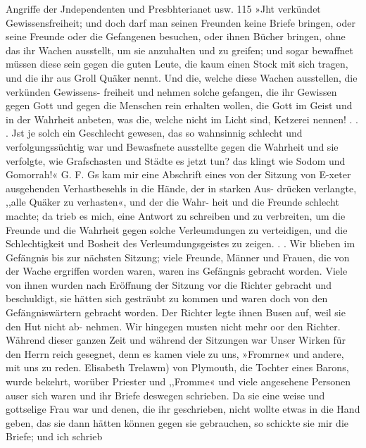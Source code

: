 Angriffe der Jndependenten und Presbhterianet usw. 115
»Jht verkündet Gewissensfreiheit; und doch darf man seinen
Freunden keine Briefe bringen, oder seine Freunde oder die
Gefangenen besuchen, oder ihnen Bücher bringen, ohne das ihr
Wachen ausstellt, um sie anzuhalten und zu greifen; und sogar
bewaffnet müssen diese sein gegen die guten Leute, die kaum
einen Stock mit sich tragen, und die ihr aus Groll Quäker nennt.
Und die, welche diese Wachen ausstellen, die verkünden Gewissens-
freiheit und nehmen solche gefangen, die ihr Gewissen gegen Gott
und gegen die Menschen rein erhalten wollen, die Gott im Geist
und in der Wahrheit anbeten, was die, welche nicht im Licht sind,
Ketzerei nennen! . . . Jst je solch ein Geschlecht gewesen, das
so wahnsinnig schlecht und verfolgungssüchtig war und Bewasfnete
ausstellte gegen die Wahrheit und sie verfolgte, wie Grafschasten
und Städte es jetzt tun? das klingt wie Sodom und Gomorrah!«
G. F.
Gs kam mir eine Abschrift eines von der Sitzung von E-xeter
ausgehenden Verhastbesehls in die Hände, der in starken Aus-
drücken verlangte, ,,alle Quäker zu verhasten«, und der die Wahr-
heit und die Freunde schlecht machte; da trieb es mich, eine
Antwort zu schreiben und zu verbreiten, um die Freunde und
die Wahrheit gegen solche Verleumdungen zu verteidigen, und
die Schlechtigkeit und Bosheit des Verleumdungsgeistes zu zeigen. . .
Wir blieben im Gefängnis bis zur nächsten Sitzung; viele
Freunde, Männer und Frauen, die von der Wache ergriffen
worden waren, waren ins Gefängnis gebracht worden. Viele
von ihnen wurden nach Eröffnung der Sitzung vor die Richter
gebracht und beschuldigt, sie hätten sich gesträubt zu kommen
und waren doch von den Gefängniswärtern gebracht worden.
Der Richter legte ihnen Busen auf, weil sie den Hut nicht ab-
nehmen. Wir hingegen musten nicht mehr oor den Richter.
Während dieser ganzen Zeit und während der Sitzungen war
Unser Wirken für den Herrn reich gesegnet, denn es kamen viele
zu uns, »Fromrne« und andere, mit uns zu reden. Elisabeth
Trelawm) von Plymouth, die Tochter eines Barons, wurde bekehrt,
worüber Priester und ,,Fromme« und viele angesehene Personen
auser sich waren und ihr Briefe deswegen schrieben. Da sie eine
weise und gottselige Frau war und denen, die ihr geschrieben,
nicht wollte etwas in die Hand geben, das sie dann hätten können
gegen sie gebrauchen, so schickte sie mir die Briefe; und ich schrieb
 


